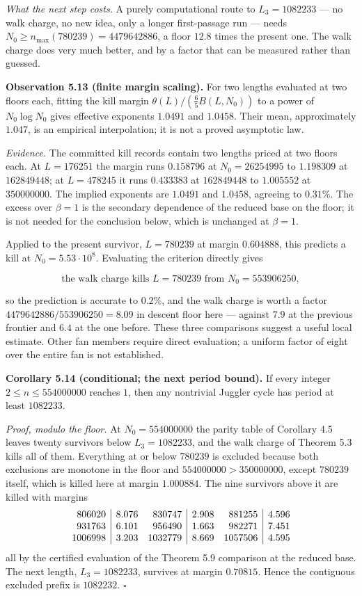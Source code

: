 \documentclass[12pt]{article}
\begin{document}
\emph{What the next step costs.} A purely computational route to
\(L_3=1082233\) --- no walk charge, no new idea, only a longer
first-passage run --- needs \(N_0\ge n_{\max}(780239)=4479642886\), a
floor \(12.8\) times the present one. The walk charge does very much
better, and by a factor that can be measured rather than guessed.

\textbf{Observation 5.13 (finite margin scaling).} For two lengths
evaluated at two floors each, fitting the kill margin
\(\theta(L)/(\tfrac65B(L,N_0))\) to a power of \(N_0\log N_0\) gives
effective exponents \(1.0491\) and \(1.0458\). Their mean, approximately
\(1.047\), is an empirical interpolation; it is not a proved asymptotic
law.

\emph{Evidence.} The committed kill records contain two lengths priced
at two floors each. At \(L=176251\) the margin runs \(0.158796\) at
\(N_0=26254995\) to \(1.198309\) at \(162849448\); at \(L=478245\) it
runs \(0.433383\) at \(162849448\) to \(1.005552\) at \(350000000\). The
implied exponents are \(1.0491\) and \(1.0458\), agreeing to \(0.31\%\).
The excess over \(\beta=1\) is the secondary dependence of the reduced
base on the floor; it is not needed for the conclusion below, which is
unchanged at \(\beta=1\).

Applied to the present survivor, \(L=780239\) at margin \(0.604888\),
this predicts a kill at \(N_0=5.53\cdot10^{8}\). Evaluating the
criterion directly gives

\[
\text{the walk charge kills } L=780239 \text{ from } N_0=553906250,
\]

so the prediction is accurate to \(0.2\%\), and the walk charge is worth
a factor \(4479642886/553906250=8.09\) in descent floor here --- against
\(7.9\) at the previous frontier and \(6.4\) at the one before. These
three comparisons suggest a useful local estimate. Other fan members
require direct evaluation; a uniform factor of eight over the entire fan
is not established.

\textbf{Corollary 5.14 (conditional; the next period bound).} If every
integer \(2\le n\le 554000000\) reaches \(1\), then any nontrivial
Juggler cycle has period at least \(1082233\).

\emph{Proof, modulo the floor.} At \(N_0=554000000\) the parity table of
Corollary 4.5 leaves twenty survivors below \(L_3=1082233\), and the
walk charge of Theorem 5.3 kills all of them. Everything at or below
\(780239\) is excluded because both exclusions are monotone in the floor
and \(554000000>350000000\), except \(780239\) itself, which is killed
here at margin \(1.000884\). The nine survivors above it are killed with
margins \[
\begin{array}{r|r@{\quad}r|r@{\quad}r|r}
806020 & 8.076 & 830747 & 2.908 & 881255 & 4.596\\
931763 & 6.101 & 956490 & 1.663 & 982271 & 7.451\\
1006998 & 3.203 & 1032779 & 8.669 & 1057506 & 4.595
\end{array}
\] all by the certified evaluation of the Theorem 5.9 comparison at the
reduced base. The next length, \(L_3=1082233\), survives at margin
\(0.70815\). Hence the contiguous excluded prefix is \(1082232\).
\(\square\)
\end{document}
